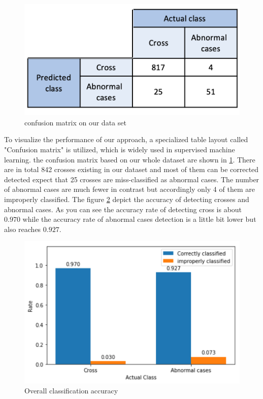 \documentclass[a4paper,twoside]{article}
\begin{document}
\begin{figure}[!h]
  \centering
  \includegraphics[width=\columnwidth]{Latex/imgs/confusion_matix.png}
  \caption{confusion matrix on our data set}
  \label{fig:confusion_matrix}
 \end{figure}
To visualize the performance of our approach,  a specialized table layout called "Confusion matrix" is utilized, which is widely used in supervised machine learning. the confusion matrix based on our whole dataset are shown in \ref{fig:confusion_matrix}. There are in total 842 crosses existing in our dataset and most of them can be corrected detected expect that 25 crosses are miss-classified as abnormal cases. The number of abnormal cases are much fewer in contrast but accordingly only 4 of them are improperly classified. The figure \ref{fig:class_accuracy} depict the accuracy of detecting crosses and abnormal cases. As you can see the accuracy rate of detecting cross is about $0.970$ while the accuracy rate of abnormal cases detection is a little bit lower but also reaches $0.927$.\\
 \begin{figure}[!h]
  \centering
  \includegraphics[width=\columnwidth]{Latex/imgs/Bar_figure.png}
  \caption{Overall classification accuracy}
  \label{fig:class_accuracy}
 \end{figure}
\end{document}

